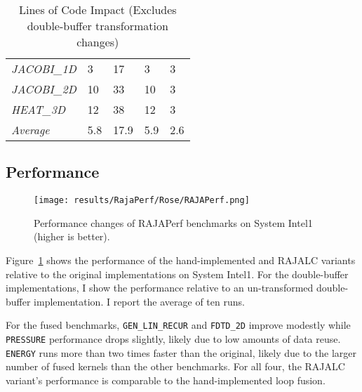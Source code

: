 \begin{table}[t]
\begin{tabular}{|l|l|l|l|l|}
\textit{JACOBI\_1D}      & 3                                               & 17                                           & 3                                              & 3                                            \\
\textit{JACOBI\_2D}      & 10                                              & 33                                           & 10                                             & 3                                            
\\
\textit{HEAT\_3D}        & 12                                              & 38                                           & 12                                             & 3                                            \\ \hline
\textit{Average}        & 5.8                                              & 17.9                                           & 5.9                                            & 2.6                                            \\ \hline
\end{tabular}
\caption{Lines of Code Impact (Excludes double-buffer transformation changes)}\label{sloc}
\end{table}

\subsection{Performance}
\begin{figure}
\texttt{[image: results/RajaPerf/Rose/RAJAPerf.png]}
\caption{Performance changes of RAJAPerf benchmarks on System Intel1 (higher is better).}
\label{RAJAPerfPerf}
\end{figure}
Figure~\ref{RAJAPerfPerf} shows the performance of the hand-implemented
and RAJALC variants relative to the original implementations on System Intel1. 
For the double-buffer implementations, I show the performance relative to an 
un-transformed double-buffer implementation. 
I report the average of ten runs. 

For the fused benchmarks, \verb.GEN_LIN_RECUR. and \verb.FDTD_2D. improve
modestly while \verb.PRESSURE. performance drops slightly, likely due to low amounts of data reuse. 
\verb.ENERGY. runs more than two times faster than the original, likely due
to the larger number of fused kernels than the other benchmarks. 
For all four, the RAJALC variant's performance is comparable to the
hand-implemented loop fusion. 
 

